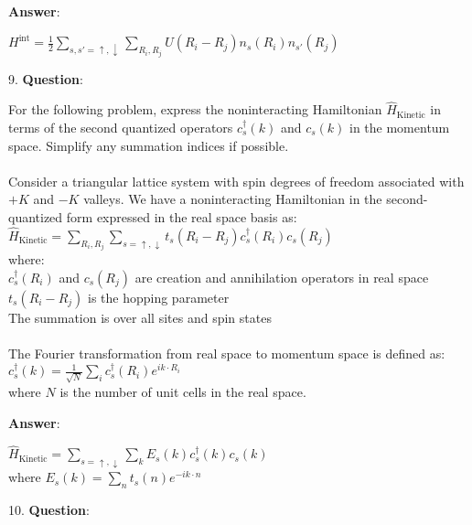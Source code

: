 \documentclass{article}
\begin{document}
   \textbf{Answer}:

   $H^{\text{int}} = \frac{1}{2} \sum_{s,s'=\uparrow,\downarrow} \sum_{R_i,R_j} U(R_i - R_j)n_s(R_i)n_{s'}(R_j)$ \\


\clearpage

9. \textbf{Question}:

   For the following problem, express the noninteracting Hamiltonian $\hat{H}_{\text{Kinetic}}$ in terms of the second quantized operators $c_s^\dagger(k)$ and $c_s(k)$ in the momentum space. Simplify any summation indices if possible. \\ \\Consider a triangular lattice system with spin degrees of freedom associated with $+K$ and $-K$ valleys. We have a noninteracting Hamiltonian in the second-quantized form expressed in the real space basis as: \\$\hat{H}_{\text{Kinetic}} = \sum_{R_i,R_j} \sum_{s=\uparrow,\downarrow} t_s(R_i - R_j) c_s^\dagger(R_i)c_s(R_j)$ \\where: \\$c_s^\dagger(R_i)$ and $c_s(R_j)$ are creation and annihilation operators in real space \\$t_s(R_i - R_j)$ is the hopping parameter \\The summation is over all sites and spin states \\ \\The Fourier transformation from real space to momentum space is defined as: \\$c_s^\dagger(k) = \frac{1}{\sqrt{N}} \sum_i c_s^\dagger(R_i)e^{ik \cdot R_i}$ \\where $N$ is the number of unit cells in the real space.

   \textbf{Answer}:

   $\hat{H}_{\text{Kinetic}} = \sum_{s=\uparrow,\downarrow} \sum_k E_s(k)c_s^\dagger(k)c_s(k)$ \\
where $E_s(k) = \sum_n t_s(n)e^{-ik \cdot n}$ \\


\clearpage

10. \textbf{Question}:
\end{document}
